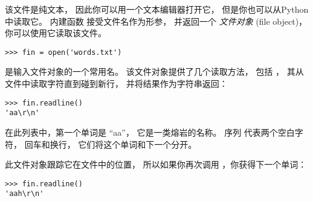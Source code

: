 
该文件是纯文本， 因此你可以用一个文本编辑器打开它， 但是你也可以从Python中读取它。 内建函数  接受文件名作为形参， 并返回一个 {\em 文件对象} (file object)， 你可以使用它读取该文件。

  
  
  

\begin{lstlisting}
>>> fin = open('words.txt')
\end{lstlisting}


 是输入文件对象的一个常用名。 该文件对象提供了几个读取方法，
包括 ， 其从文件中读取字符直到碰到新行， 并将结果作为字符串返回：

\begin{lstlisting}
>>> fin.readline()
'aa\r\n'
\end{lstlisting}


在此列表中，第一个单词是 ``aa''， 它是一类熔岩的名称。 序列 \li{\r\n} 代表两个空白字符， 回车和换行， 它们将这个单词和下一个分开。


此文件对象跟踪它在文件中的位置，
所以如果你再次调用 ，你获得下一个单词：

\begin{lstlisting}
>>> fin.readline()
'aah\r\n'
\end{lstlisting}



